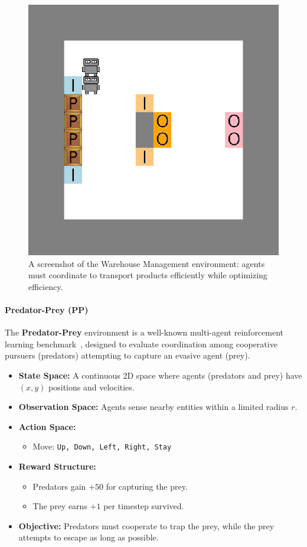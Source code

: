 \documentclass[pdflatex,sn-mathphys-num]{sn-jnl}%
\theoremstyle{thmstyleone}%
\theoremstyle{thmstyletwo}%
\theoremstyle{thmstylethree}%
\begin{document}
\begin{figure}[h!]
  \centering
  \includegraphics[width=0.7\linewidth]{figures/wm.png}
  \caption{A screenshot of the Warehouse Management environment: agents must coordinate to transport products efficiently while optimizing efficiency.}
  \label{fig:warehouse}
\end{figure}

\paragraph{Predator-Prey (PP)}
The \textbf{Predator-Prey} environment is a well-known multi-agent reinforcement learning benchmark~\cite{lowe2017multi}, designed to evaluate coordination among cooperative pursuers (predators) attempting to capture an evasive agent (prey).

\begin{itemize}
    \item \textbf{State Space:} A continuous 2D space where agents (predators and prey) have $(x, y)$ positions and velocities.
    \item \textbf{Observation Space:} Agents sense nearby entities within a limited radius $r$.
    \item \textbf{Action Space:} 
    \begin{itemize}
        \item Move: \texttt{Up, Down, Left, Right, Stay}
    \end{itemize}
    \item \textbf{Reward Structure:}
    \begin{itemize}
        \item Predators gain $+50$ for capturing the prey.
        \item The prey earns $+1$ per timestep survived.
    \end{itemize}
    \item \textbf{Objective:} Predators must cooperate to trap the prey, while the prey attempts to escape as long as possible.
\end{itemize}
\end{document}

